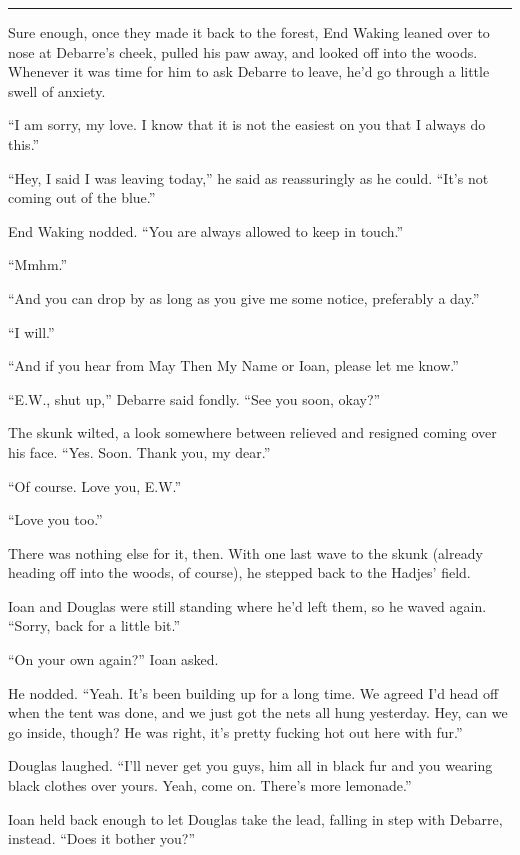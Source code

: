 \begin{center}\rule{0.5\linewidth}{0.5pt}\end{center}

Sure enough, once they made it back to the forest, End Waking leaned over to nose at Debarre's cheek, pulled his paw away, and looked off into the woods. Whenever it was time for him to ask Debarre to leave, he'd go through a little swell of anxiety.

``I am sorry, my love. I know that it is not the easiest on you that I always do this.''

``Hey, I said I was leaving today,'' he said as reassuringly as he could. ``It's not coming out of the blue.''

End Waking nodded. ``You are always allowed to keep in touch.''

``Mmhm.''

``And you can drop by as long as you give me some notice, preferably a day.''

``I will.''

``And if you hear from May Then My Name or Ioan, please let me know.''

``E.W., shut up,'' Debarre said fondly. ``See you soon, okay?''

The skunk wilted, a look somewhere between relieved and resigned coming over his face. ``Yes. Soon. Thank you, my dear.''

``Of course. Love you, E.W.''

``Love you too.''

There was nothing else for it, then. With one last wave to the skunk (already heading off into the woods, of course), he stepped back to the Hadjes' field.

Ioan and Douglas were still standing where he'd left them, so he waved again. ``Sorry, back for a little bit.''

``On your own again?'' Ioan asked.

He nodded. ``Yeah. It's been building up for a long time. We agreed I'd head off when the tent was done, and we just got the nets all hung yesterday. Hey, can we go inside, though? He was right, it's pretty fucking hot out here with fur.''

Douglas laughed. ``I'll never get you guys, him all in black fur and you wearing black clothes over yours. Yeah, come on. There's more lemonade.''

Ioan held back enough to let Douglas take the lead, falling in step with Debarre, instead. ``Does it bother you?''

